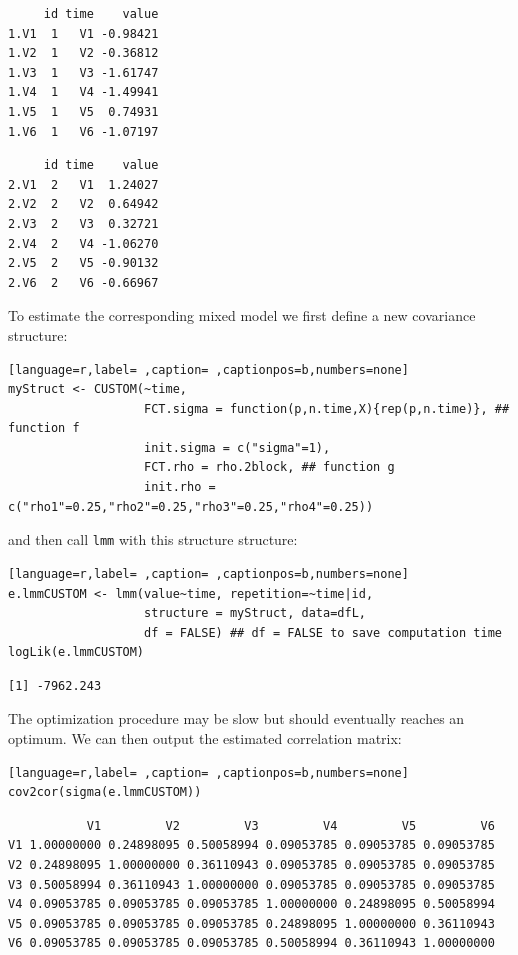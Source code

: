 \documentclass[12pt]{article}
\begin{document}
\begin{minipage}{0.45\linewidth}
\begin{verbatim}
     id time    value
1.V1  1   V1 -0.98421
1.V2  1   V2 -0.36812
1.V3  1   V3 -1.61747
1.V4  1   V4 -1.49941
1.V5  1   V5  0.74931
1.V6  1   V6 -1.07197
\end{verbatim}


\end{minipage}
\begin{minipage}{0.45\linewidth}
\begin{verbatim}
     id time    value
2.V1  2   V1  1.24027
2.V2  2   V2  0.64942
2.V3  2   V3  0.32721
2.V4  2   V4 -1.06270
2.V5  2   V5 -0.90132
2.V6  2   V6 -0.66967
\end{verbatim}


\end{minipage}

\clearpage

To estimate the corresponding mixed model we first define a new
covariance structure:
\begin{lstlisting}[language=r,label= ,caption= ,captionpos=b,numbers=none]
myStruct <- CUSTOM(~time,
                   FCT.sigma = function(p,n.time,X){rep(p,n.time)}, ## function f
                   init.sigma = c("sigma"=1),
                   FCT.rho = rho.2block, ## function g
                   init.rho = c("rho1"=0.25,"rho2"=0.25,"rho3"=0.25,"rho4"=0.25))
\end{lstlisting}

and then call \texttt{lmm} with this structure structure:
\begin{lstlisting}[language=r,label= ,caption= ,captionpos=b,numbers=none]
e.lmmCUSTOM <- lmm(value~time, repetition=~time|id,
                   structure = myStruct, data=dfL,
                   df = FALSE) ## df = FALSE to save computation time
logLik(e.lmmCUSTOM)
\end{lstlisting}

\begin{verbatim}
[1] -7962.243
\end{verbatim}


The optimization procedure may be slow but should eventually reaches
an optimum. We can then output the estimated correlation matrix:
\begin{lstlisting}[language=r,label= ,caption= ,captionpos=b,numbers=none]
cov2cor(sigma(e.lmmCUSTOM))
\end{lstlisting}

\begin{verbatim}
           V1         V2         V3         V4         V5         V6
V1 1.00000000 0.24898095 0.50058994 0.09053785 0.09053785 0.09053785
V2 0.24898095 1.00000000 0.36110943 0.09053785 0.09053785 0.09053785
V3 0.50058994 0.36110943 1.00000000 0.09053785 0.09053785 0.09053785
V4 0.09053785 0.09053785 0.09053785 1.00000000 0.24898095 0.50058994
V5 0.09053785 0.09053785 0.09053785 0.24898095 1.00000000 0.36110943
V6 0.09053785 0.09053785 0.09053785 0.50058994 0.36110943 1.00000000
\end{verbatim}
\end{document}
